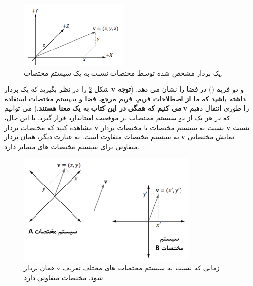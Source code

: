 {\begin{spacing}{1.5}
        \begin{figure}[H]
            \centering
            \setlength{\belowcaptionskip}{-10pt}
            \includegraphics[width=0.48\textwidth]{Images/4/4.Session.1.1.3}
            \caption{یک بردار مشخص شده توسط مختصات نسبت به یک سیستم مختصات.}
            \label{fig:4.Session.1.1.3}
        \end{figure}

        شکل \ref{fig:4.Session.1.1.4} را در نظر بگیرید که یک بردار \textbf{v} و دو فریم () در فضا را نشان می دهد. (\textbf{توجه داشته باشید که ما از اصطلاحات فریم، فریم مرجع، فضا و سیستم مختصات استفاده می کنیم که همگی در این کتاب به یک معنا هستند.})
        می توانیم \textbf{v} را طوری انتقال دهیم که در هر یک از دو سیستم مختصات در موقعیت استاندارد قرار گیرد. با این حال، مشاهده کنید که مختصات بردار \textbf{v} نسبت به سیستم مختصات  با مختصات بردار \textbf{v} نسبت به سیستم مختصات  متفاوت است.
        به عبارت دیگر، همان بردار \textbf{v} نمایش مختصاتی متفاوتی برای سیستم مختصات های متمایز دارد.

        \begin{figure}[H]
            \centering
            \setlength{\belowcaptionskip}{-10pt}
            \includegraphics[width=0.8\textwidth]{Images/4/4.Session.1.1.4}
            \caption{همان بردار v زمانی که نسبت به سیستم مختصات های مختلف تعریف شود، مختصات متفاوتی دارد.}
            \label{fig:4.Session.1.1.4}
        \end{figure}


\end{spacing}}
